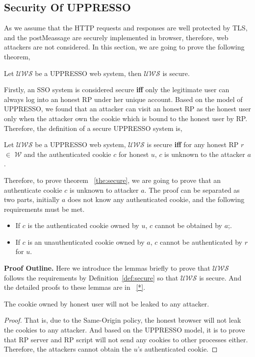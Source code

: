 \subsection{Security Of UPPRESSO}
As we assume that the HTTP requests and responses are well protected by TLS, and the postMeassage are securely implemented in browser, therefore, web attackers are not considered.
In this section, we are going to prove the following theorem,
\begin{theorem}
Let $\mathcal{UWS}$ be a UPPRESSO web system, then $\mathcal{UWS}$ is secure. 
\label{the:secure}
\end{theorem}
Firstly, an SSO system is considered secure \textbf{iff} only the legitimate user can always log into an honest RP under her unique account. Based on the model of UPPRESSO, we found that  an attacker can visit an honest RP as the honest user only when the attacker own the cookie which is bound to the honest user by RP. Therefore, the definition of a secure UPPRESSO system is, 
\begin{definition}
Let $\mathcal{UWS}$ be a UPPRESSO web system, $\mathcal{UWS}$ is secure \textbf{iff} for any honest RP $r$ $\in $ $\mathcal{W}$ and  the authenticated cookie $c$ for honest $u$,  $c$ is unknown to the attacker $a$. 
\label{def:secure}
\end{definition}
Therefore, to prove theorem ~\ref{the:secure}, we are going to prove that an authenticate cookie $c$ is unknown to attacker $a$. The proof can be separated as two parts, initially $a$ does not know any authenticated cookie, and the following requirements must be met.
\begin{itemize}
\item If $c$ is the authenticated cookie owned by $u$, $c$ cannot be obtained by $a$;.
\item If $c$ is an unauthenticated cookie owned by $a$, $c$ cannot be authenticated by $r$ for $u$. 
\end{itemize}



\vspace{1mm}\noindent\textbf{Proof Outline. } 
Here we introduce the lemmas briefly to prove that $\mathcal{UWS}$ follows the requirements by Definition~\ref{def:secure} so that $\mathcal{UWS}$ is secure. And the detailed proofs to these lemmas are in ~\ref{*}.

\begin{lemma}
The cookie owned by honest user will not be leaked to any attacker.
\label{lemma:cookie}
\end{lemma}
\begin{proof}
That is, due to the Same-Origin policy, the honest browser will not leak the cookies to any attacker. And based on the UPPRESSO model, it is to prove that RP server and RP script will not send any cookies to other processes either. Therefore, the attackers cannot obtain the $u$'s authenticated  cookie. 
\end{proof}


